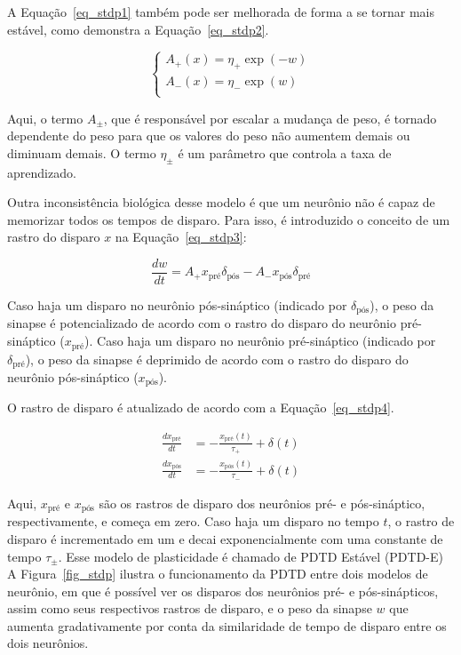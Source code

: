 A Equação~\ref{eq_stdp1} também pode ser melhorada de forma a se tornar mais estável, como demonstra a Equação~\ref{eq_stdp2}.

\begin{equation}
\label{eq_stdp2}
\begin{cases}
    A_{+}(x) = \eta_{+} \exp(-w)\\
    A_{-}(x) = \eta_{-} \exp(w)\\
\end{cases}
\end{equation}

\noindent{}Aqui, o termo $A_{\pm}$, que é responsável por escalar a mudança de peso, é tornado dependente do peso para que os valores do peso
não aumentem demais ou diminuam demais. O termo $\eta_{\pm}$ é um parâmetro que controla a taxa de aprendizado.

Outra inconsistência biológica desse modelo é que um neurônio não é capaz de memorizar todos os tempos de disparo. Para isso, é
introduzido o conceito de um rastro do disparo $x$ na Equação~\ref{eq_stdp3}:

\begin{equation}
\label{eq_stdp3}
\frac{dw}{dt} = A_{+} x_{\text{pré}} \delta_{\text{pós}} - A_{-} x_{\text{pós}} \delta_{\text{pré}}
\end{equation}

\noindent{}Caso haja um disparo no neurônio pós-sináptico (indicado por $\delta_{\text{pós}}$), o peso da sinapse é potencializado de acordo
com o rastro do disparo do neurônio pré-sináptico ($x_{\text{pré}}$). Caso haja um disparo no neurônio pré-sináptico (indicado por
$\delta_{\text{pré}}$), o peso da sinapse é deprimido de acordo com o rastro do disparo do neurônio pós-sináptico
($x_{\text{pós}}$).

O rastro de disparo é atualizado de acordo com a Equação~\ref{eq_stdp4}.

\begin{align}
\label{eq_stdp4}
\frac{dx_{\text{pré}}}{dt} &= -\frac{x_{\text{pré}}(t)}{\tau_{+}}+\delta(t)\\
\frac{dx_{\text{pós}}}{dt} &= -\frac{x_{\text{pós}}(t)}{\tau_{-}}+\delta(t)
\end{align}

Aqui, $x_{\text{pré}}$ e $x_{\text{pós}}$ são os rastros de disparo dos neurônios pré- e pós-sináptico, respectivamente, e começa
em zero. Caso haja um disparo no tempo $t$, o rastro de disparo é incrementado em um e decai exponencialmente com uma constante de
tempo $\tau_{\pm}$. Esse modelo de plasticidade é chamado de PDTD Estável (PDTD-E)~\cite{paredes-vallesUnsupervised2018} A
Figura~\ref{fig_stdp} ilustra o funcionamento da PDTD entre dois modelos de neurônio, em que é possível ver os disparos dos
neurônios pré- e pós-sinápticos, assim como seus respectivos rastros de disparo, e o peso da sinapse $w$ que aumenta
gradativamente por conta da similaridade de tempo de disparo entre os dois neurônios.

